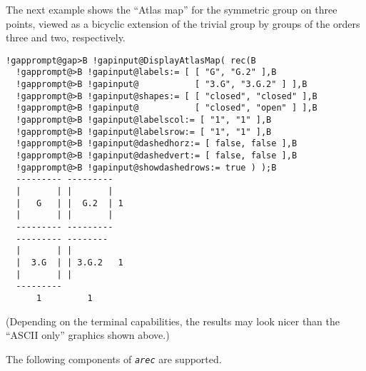 \documentclass[a4paper,11pt]{report}
\begin{document}
{{{ The next example shows the ``\textsf{Atlas} map'' for the symmetric group on three points, viewed as a bicyclic extension of the
trivial group by groups of the orders three and two, respectively. 

 
\begin{Verbatim}[commandchars=!@B,fontsize=\small,frame=single,label=Example]
  !gapprompt@gap>B !gapinput@DisplayAtlasMap( rec(B
  !gapprompt@>B !gapinput@labels:= [ [ "G", "G.2" ],B
  !gapprompt@>B !gapinput@           [ "3.G", "3.G.2" ] ],B
  !gapprompt@>B !gapinput@shapes:= [ [ "closed", "closed" ],B
  !gapprompt@>B !gapinput@           [ "closed", "open" ] ],B
  !gapprompt@>B !gapinput@labelscol:= [ "1", "1" ],B
  !gapprompt@>B !gapinput@labelsrow:= [ "1", "1" ],B
  !gapprompt@>B !gapinput@dashedhorz:= [ false, false ],B
  !gapprompt@>B !gapinput@dashedvert:= [ false, false ],B
  !gapprompt@>B !gapinput@showdashedrows:= true ) );B
  --------- ---------  
  |       | |       |  
  |   G   | |  G.2  | 1
  |       | |       |  
  --------- ---------  
  --------- --------   
  |       | |          
  |  3.G  | | 3.G.2   1
  |       | |          
  ---------            
      1         1    
\end{Verbatim}
 

 (Depending on the terminal capabilities, the results may look nicer than the ``ASCII only'' graphics shown above.) 

 The following components of \mbox{\texttt{\mdseries\slshape arec}} are supported. 

}}}
\end{document}
